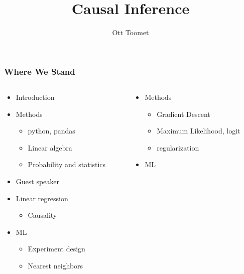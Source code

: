 \documentclass[mathserif, xcolor=table, svgnames]{beamer}
\title{Causal Inference}
\author{Ott Toomet}
\begin{document}
\lstset{language=Python}

\begin{frame}
  \maketitle
\end{frame}

\begin{frame}
  \tableofcontents
\end{frame}

\begin{frame}
\frametitle{Where We Stand}
\begin{columns}
  \begin{column}{0.5\linewidth}
    \begin{itemize}
    \item Introduction
    \item Methods
      \begin{itemize}
      \item python, pandas
      \item Linear algebra
      \item Probability and statistics
      \end{itemize}
    \item Guest speaker
    \item Linear regression
      \begin{itemize}
      \item \alert{Causality}
      \end{itemize}
    \item ML
      \begin{itemize}
      \item Experiment design
      \item Nearest neighbors
      \end{itemize}
    \end{itemize}
  \end{column}
  \begin{column}{0.5\linewidth}
    \begin{itemize}
    \item Methods
      \begin{itemize}
      \item Gradient Descent 
      \item Maximum Likelihood, logit
      \item regularization
      \end{itemize}
    \item ML

\end{itemize}
\end{column}
\end{columns}
\end{frame}
\end{document}
